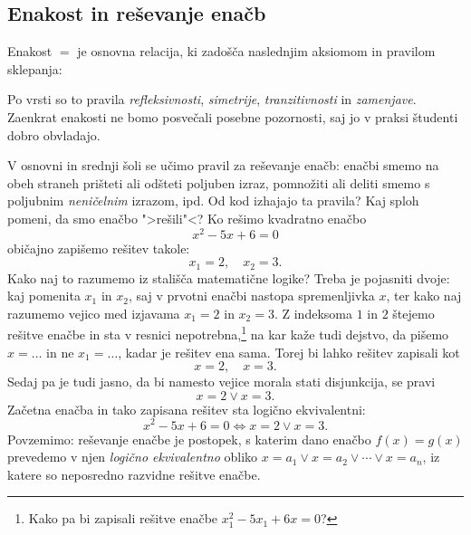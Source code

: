 \subsection{Enakost in reševanje enačb}
\label{sec:enakost}

Enakost $=$ je osnovna relacija, ki zadošča naslednjim aksiomom in
pravilom sklepanja:
%
%
Po vrsti so to pravila \emph{refleksivnosti}, \emph{simetrije},
\emph{tranzitivnosti} in \emph{zamenjave}. Zaenkrat enakosti ne bomo
posvečali posebne pozornosti, saj jo v praksi študenti dobro
obvladajo.

V osnovni in srednji šoli se učimo pravil za reševanje enačb: enačbi
smemo na obeh straneh prišteti ali odšteti poljuben izraz, pomnožiti
ali deliti smemo s poljubnim \emph{neničelnim} izrazom, ipd. Od kod
izhajajo ta pravila? Kaj sploh pomeni, da smo enačbo ">rešili"<? Ko
rešimo kvadratno enačbo
%
\begin{equation*}
  x^2 - 5 x + 6 = 0
\end{equation*}
%
običajno zapišemo rešitev takole:
%
\begin{equation*}
  x_1 = 2, \quad x_2 = 3.
\end{equation*}
%
Kako naj to razumemo iz stališča matematične logike? Treba je
pojasniti dvoje: kaj pomenita $x_1$ in $x_2$, saj v prvotni enačbi
nastopa spremenljivka $x$, ter kako naj razumemo vejico med izjavama
$x_1 = 2$ in $x_2 = 3$. Z indeksoma $1$ in $2$ štejemo rešitve enačbe
in sta v resnici nepotrebna,\footnote{Kako pa bi zapisali rešitve
  enačbe $x_1^2 - 5 x_1 + 6 x = 0$?} na kar kaže tudi dejstvo, da
pišemo $x = \ldots$ in ne $x_1 = \ldots$, kadar je rešitev ena sama.
Torej bi lahko rešitev zapisali kot
%
\begin{equation*}
  x = 2, \quad x = 3.
\end{equation*}
%
Sedaj pa je tudi jasno, da bi namesto vejice morala stati disjunkcija,
se pravi
%
\begin{equation*}
  x = 2 \lor x = 3.
\end{equation*}
%
Začetna enačba in tako zapisana rešitev sta logično ekvivalentni:
%
\begin{equation*}
  x^2 - 5 x + 6 = 0 \iff
  x = 2 \lor x = 3.
\end{equation*}
%
Povzemimo: reševanje enačbe je postopek, s katerim dano enačbo $f(x) =
g(x)$ prevedemo v njen \emph{logično ekvivalentno} obliko $x = a_1
\lor x = a_2 \lor \cdots \lor x = a_n$, iz katere so neposredno razvidne
rešitve enačbe.

